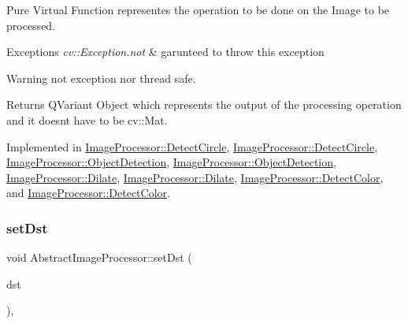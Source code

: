 Pure Virtual Function representes the operation to be done on the Image to be processed. 


\begin{DoxyExceptions}{Exceptions}
{\em cv\+::\+Exception.\+not} & garunteed to throw this exception \\
\hline
\end{DoxyExceptions}
\begin{DoxyWarning}{Warning}
not exception nor thread safe. 
\end{DoxyWarning}
\begin{DoxyReturn}{Returns}
Q\+Variant Object which represents the output of the processing operation and it doesn\textquotesingle{}t have to be cv\+::\+Mat. 
\end{DoxyReturn}


Implemented in \hyperlink{class_image_processor_1_1_detect_circle_ae0c7b4759827b218a03b16567233b4d5}{Image\+Processor\+::\+Detect\+Circle}, \hyperlink{class_image_processor_1_1_detect_circle_ae59a596ca1e992a8d8f859b5f79239f5}{Image\+Processor\+::\+Detect\+Circle}, \hyperlink{class_image_processor_1_1_object_detection_ac5561650d95eac1672e2d049ed36201d}{Image\+Processor\+::\+Object\+Detection}, \hyperlink{class_image_processor_1_1_object_detection_ad8ff5b55d6da63f30dc397082f97370c}{Image\+Processor\+::\+Object\+Detection}, \hyperlink{class_image_processor_1_1_dilate_ac4af4d83e97990416f1ccc6b80fd140b}{Image\+Processor\+::\+Dilate}, \hyperlink{class_image_processor_1_1_dilate_a47c84e673efe4a1280eede2ea9cb4ef9}{Image\+Processor\+::\+Dilate}, \hyperlink{class_image_processor_1_1_detect_color_afb14622f8e1390f1cf887cc8bf1da568}{Image\+Processor\+::\+Detect\+Color}, and \hyperlink{class_image_processor_1_1_detect_color_a7dc9d23817afafa44a9c022dff64b4a5}{Image\+Processor\+::\+Detect\+Color}.

\mbox{\label{class_image_processor_1_1_abstract_image_processor_a8d9dcbea1b426f4accdd8fcc650eb6ab}} 
\subsubsection{\texorpdfstring{set\+Dst}{setDst}}
{\footnotesize\ttfamily void Abstract\+Image\+Processor\+::set\+Dst (\begin{DoxyParamCaption}\item[{const cv\+::\+Mat \&}]{dst }\end{DoxyParamCaption})\hspace{0.3cm}{\ttfamily [virtual]}, {\ttfamily [slot]}}




